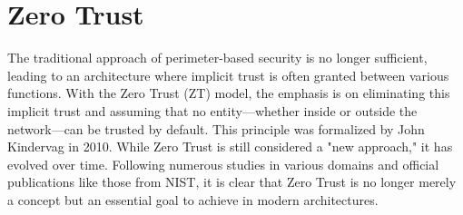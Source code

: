 \documentclass{report}
\begin{document}
\section{Zero Trust}
The traditional approach of perimeter-based security is no longer sufficient, leading to an architecture where implicit trust is often granted between various functions. With the Zero Trust (ZT) model, the emphasis is on eliminating this implicit trust and assuming that no entity—whether inside or outside the network—can be trusted by default. This principle was formalized by John Kindervag in 2010. While Zero Trust is still considered a "new approach," it has evolved over time. Following numerous studies in various domains and official publications like those from NIST, it is clear that Zero Trust is no longer merely a concept but an essential goal to achieve in modern architectures. \cite{stafford2020zero}
\end{document}
